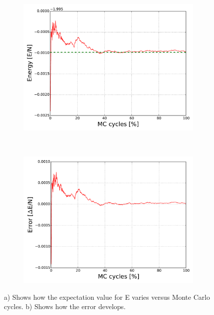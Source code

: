 \begin{figure}[H]
    \centering
    \begin{subfigure}{0.5\textwidth}
        \centering
        \includegraphics[width=\linewidth]{result/bilder/2x2/energy22}
        \caption{}
    \end{subfigure}%
    ~ 
    \begin{subfigure}{0.5\textwidth}
        \centering
        \includegraphics[width=\linewidth]{result/bilder/2x2/energyerror22}
        \caption{}
    \end{subfigure}
    \caption{a) Shows how the expectation value for E varies versus Monte Carlo cycles. b) Shows how the error develops.}
    \label{fig:22-energy}
\end{figure}

